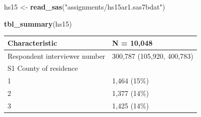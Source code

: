 \documentclass[]{article}
\newenvironment{Shaded}{\begin{snugshade}}{\end{snugshade}}
\newcommand{\KeywordTok}[1]{\textcolor[rgb]{0.13,0.29,0.53}{\textbf{#1}}}
\newcommand{\NormalTok}[1]{#1}
\newcommand{\StringTok}[1]{\textcolor[rgb]{0.31,0.60,0.02}{#1}}
\begin{document}
\begin{Shaded}
\begin{Highlighting}[]
\NormalTok{hs15 <-}\StringTok{ }\KeywordTok{read_sas}\NormalTok{(}\StringTok{"assignments/hs15ar1.sas7bdat"}\NormalTok{)}

\KeywordTok{tbl_summary}\NormalTok{(hs15)}
\end{Highlighting}
\end{Shaded}

\begin{longtable}[]{@{}ll@{}}
\toprule
\begin{minipage}[b]{0.71\columnwidth}\raggedright
\textbf{Characteristic}\strut
\end{minipage} & \begin{minipage}[b]{0.23\columnwidth}\raggedright
\textbf{N = 10,048}\strut
\end{minipage}\tabularnewline
\midrule
\endhead
\begin{minipage}[t]{0.71\columnwidth}\raggedright
Respondent interviewer number\strut
\end{minipage} & \begin{minipage}[t]{0.23\columnwidth}\raggedright
300,787 (105,920, 400,783)\strut
\end{minipage}\tabularnewline
\begin{minipage}[t]{0.71\columnwidth}\raggedright
S1 County of residence\strut
\end{minipage} & \begin{minipage}[t]{0.23\columnwidth}\raggedright
\strut
\end{minipage}\tabularnewline
\begin{minipage}[t]{0.71\columnwidth}\raggedright
1\strut
\end{minipage} & \begin{minipage}[t]{0.23\columnwidth}\raggedright
1,464 (15\%)\strut
\end{minipage}\tabularnewline
\begin{minipage}[t]{0.71\columnwidth}\raggedright
2\strut
\end{minipage} & \begin{minipage}[t]{0.23\columnwidth}\raggedright
1,377 (14\%)\strut
\end{minipage}\tabularnewline
\begin{minipage}[t]{0.71\columnwidth}\raggedright
3\strut
\end{minipage} & \begin{minipage}[t]{0.23\columnwidth}\raggedright
1,425 (14\%)\strut
\end{minipage}\tabularnewline

\end{longtable}
\end{document}
